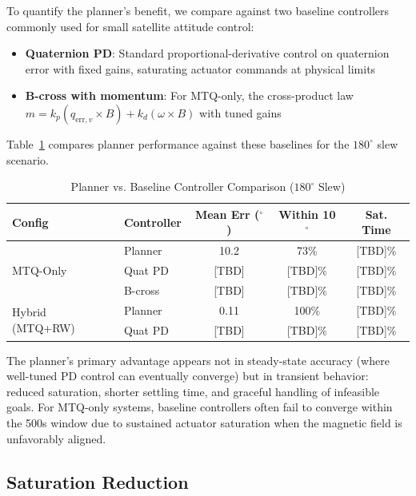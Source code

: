 \documentclass[conference]{IEEEtran}
\begin{document}
To quantify the planner's benefit, we compare against two baseline controllers commonly used for small satellite attitude control:

\begin{itemize}
    \item \textbf{Quaternion PD}: Standard proportional-derivative control on quaternion error with fixed gains, saturating actuator commands at physical limits
    \item \textbf{B-cross with momentum}: For MTQ-only, the cross-product law $m = k_p (q_{\text{err},v} \times B) + k_d (\omega \times B)$ with tuned gains
\end{itemize}

Table~\ref{tab:baseline_comparison} compares planner performance against these baselines for the $180^\circ$ slew scenario.

\begin{table}[t]
    \centering
    \caption{Planner vs. Baseline Controller Comparison ($180^\circ$ Slew)}
    \label{tab:baseline_comparison}
    \begin{tabular}{llccc}
        \toprule
        Config & Controller & Mean Err ($^\circ$) & Within 10$^\circ$ & Sat. Time \\
        \midrule
        \multirow{3}{*}{MTQ-Only}
            & Planner & 10.2 & 73\% & [TBD]\% \\
            & Quat PD & [TBD] & [TBD]\% & [TBD]\% \\
            & B-cross & [TBD] & [TBD]\% & [TBD]\% \\
        \midrule
        \multirow{2}{*}{Hybrid (MTQ+RW)}
            & Planner & 0.11 & 100\% & [TBD]\% \\
            & Quat PD & [TBD] & [TBD]\% & [TBD]\% \\
        \bottomrule
    \end{tabular}
\end{table}

The planner's primary advantage appears not in steady-state accuracy (where well-tuned PD control can eventually converge) but in transient behavior: reduced saturation, shorter settling time, and graceful handling of infeasible goals. For MTQ-only systems, baseline controllers often fail to converge within the 500s window due to sustained actuator saturation when the magnetic field is unfavorably aligned.

\subsection{Saturation Reduction}\label{subsec:saturation}
\end{document}
